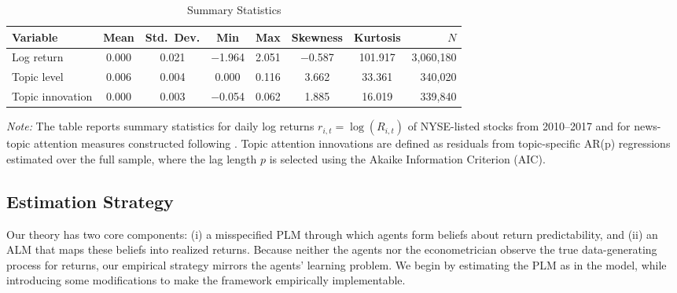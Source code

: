 \begin{table}[H]
\centering
\caption{Summary Statistics}
\label{tab:summary_stats}

\begin{tabularx}{\textwidth}{@{}>{\small}Xccccccr@{}}
\toprule
Variable & Mean & Std.\ Dev. & Min & Max & Skewness & Kurtosis & $N$ \\
\midrule
Log return 
& 0.000 & 0.021 & $-$1.964 & 2.051 & $-$0.587 & 101.917 & 3{,}060{,}180 \\
\midrule
Topic level 
& 0.006 & 0.004 & 0.000 & 0.116 & 3.662 & 33.361 & 340{,}020 \\
Topic innovation 
& 0.000 & 0.003 & $-$0.054 & 0.062 & 1.885 & 16.019 & 339{,}840 \\
\bottomrule
\end{tabularx}

\medskip
\begin{minipage}{\textwidth}
\footnotesize
\textit{Note:} The table reports summary statistics for daily log returns
$r_{i,t}=\log(R_{i,t})$ of NYSE-listed stocks from 2010--2017 and for news-topic
attention measures constructed following \citet{Bybee2021}.
Topic attention innovations are defined as residuals from topic-specific AR(p)
regressions estimated over the full sample, where the lag length $p$ is selected using the Akaike Information Criterion (AIC).
\end{minipage}
\end{table}


\subsection{Estimation Strategy}

Our theory has two core components: (i) a misspecified PLM through which agents form beliefs about return predictability, and (ii) an ALM that maps these beliefs into realized returns. 
Because neither the agents nor the econometrician observe the true data-generating process for returns, our empirical strategy mirrors the agents’ learning problem.
We begin by estimating the PLM as in the model, while introducing some modifications to make the framework empirically implementable.


